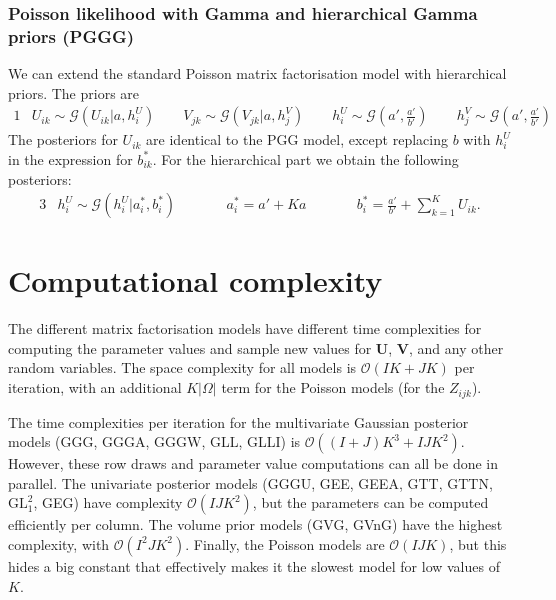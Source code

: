 \documentclass{article}
\newcommand{\U}{\boldsymbol U}
\newcommand{\V}{\boldsymbol V}
\newcommand{\sumk}{\sum_{k=1}^K}
\begin{document}
		\subsubsection{Poisson likelihood with Gamma and hierarchical Gamma priors  (PGGG)}
		We can extend the standard Poisson matrix factorisation model with hierarchical priors. The priors are
		\begin{alignat*}{1}
			&U_{ik} \sim \mathcal{G} ( U_{ik} | a, h^U_i )		\quad\quad			V_{jk} \sim \mathcal{G} ( V_{jk} | a, h^V_j )		\quad\quad			h^U_i \sim \mathcal{G} (a', \frac{a'}{b'}) 		\quad\quad		h^V_j \sim \mathcal{G} (a', \frac{a'}{b'})
		\end{alignat*}
		The posteriors for $U_{ik}$ are identical to the PGG model, except replacing $b$ with $h^U_i$ in the expression for $b^*_{ik}$. For the hierarchical part we obtain the following posteriors:
		\begin{alignat*}{3}
		&h^U_i \sim \mathcal{G} (h^U_i | a^*_i, b^*_i )   		
		\quad\quad && a^*_i = a' + K a 		
		\quad\quad && b^*_i = \frac{a'}{b'} + \sumk U_{ik}.
		\end{alignat*}
	
	
	\clearpage
	\section{Computational complexity}
		The different matrix factorisation models have different time complexities for computing the parameter values and sample new values for $\U$, $\V$, and any other random variables. The space complexity for all models is $\mathcal{O}( I K + J K ) $ per iteration, with an additional $ K \vert \Omega \vert $ term for the Poisson models (for the $Z_{ijk}$).
		
		The time complexities per iteration for the multivariate Gaussian posterior models (GGG, GGGA, GGGW, GLL, GLLI) is $ \mathcal{O}( (I+J)K^3 + IJK^2 ) $. However, these row draws and parameter value computations can all be done in parallel. 
		The univariate posterior models (GGGU, GEE, GEEA, GTT, GTTN, $\text{GL}^2_1$, GEG) have complexity $ \mathcal{O}( I J K^2 ) $, but the parameters can be computed efficiently per column. The volume prior models (GVG, GVnG) have the highest complexity, with $ \mathcal{O}( I^2 J K^2 ) $. Finally, the Poisson models are $ \mathcal{O}( I J K ) $, but this hides a big constant that effectively makes it the slowest model for low values of $K$.
			
\end{document}
